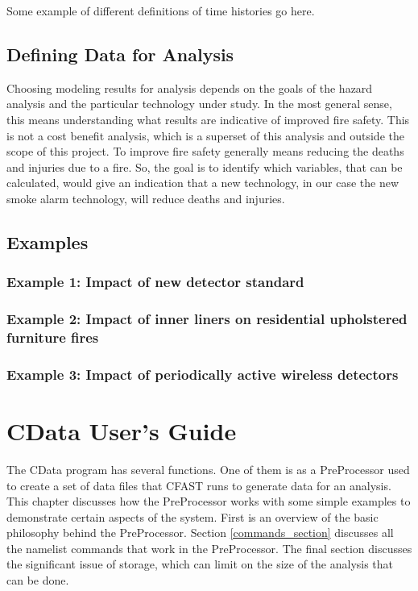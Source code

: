 \documentclass[12pt,twoside]{book}
\begin{document}
Some example of different definitions of time histories go here.

\section{Defining Data for Analysis}

Choosing modeling results for analysis depends on the goals of the hazard analysis and the particular technology under study. In the most general sense, this means understanding what results are indicative of improved fire safety. This is not a cost benefit analysis, which is a superset of this analysis and outside the scope of this project. To improve fire safety generally means reducing the deaths and injuries due to a fire. So, the goal is to identify which variables, that can be calculated, would give an indication that a new technology, in our case the new smoke alarm technology, will reduce deaths and injuries.

\section{Examples}

\subsection{Example 1: Impact of new detector standard}

\subsection{Example 2: Impact of inner liners on residential upholstered furniture fires}

\subsection{Example 3: Impact of periodically active wireless detectors}

%
%

\chapter{CData User's Guide}
The CData program has several functions. One of them is as a PreProcessor used to create a set of data files that CFAST runs to generate data for an analysis. This chapter discusses how the PreProcessor works with some simple examples to demonstrate certain aspects of the system. First is an overview of the basic philosophy behind the PreProcessor. Section \ref{commands_section} discusses all the namelist commands that work in the PreProcessor. The final section discusses the significant issue of storage, which can limit on the size of the analysis that can be done.
\end{document}
